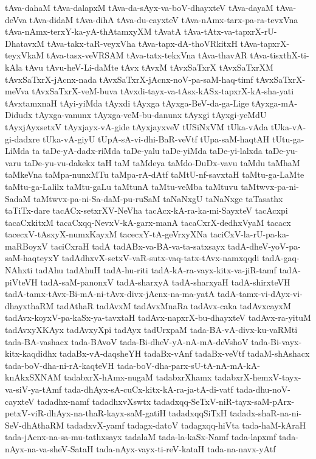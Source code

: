 {tAva-dahaM
tAva-dalapxM
tAva-da-sAyx-va-boV-dhayxteV
tAva-dayaM
tAva-deVva
tAva-didaM
tAva-dihA
tAva-du-cayxteV
tAva-nAmx-tarx-pa-ra-tevxVna
tAva-nAmx-terxY-ka-yA-thAtamxyXM
tAvatA
tAva-tAtx-va-tapxrX-rU-DhatavxM
tAva-takx-taR-veyxVha
tAva-tapx-dA-thoVRkitxH
tAva-tapxrX-teyxVkaM
tAva-tasx-veVRSAM
tAva-tatx-tekxVna
tAva-thavAR
tAva-tisxthX-ti-kAla
tAvu
tAvu-heV-Li-daMte
tAvx
tAvxM
tAvxSaTxrX
tAvxSaTxrXM
tAvxSaTxrX-jAcnx-nada
tAvxSaTxrX-jAcnx-noV-pa-saM-haq-timf
tAvxSaTxrX-meVva
tAvxSaTxrX-veM-buva
tAvxdi-tayx-va-tAsx-kASx-tapxrX-kA-sha-yati
tAvxtamxnaH
tAyi-yiMda
tAyxdi
tAyxga
tAyxga-BeV-da-ga-Lige
tAyxga-mA-Didudx
tAyxga-vanunx
tAyxga-veM-bu-danunx
tAyxgi
tAyxgi-yeMdU
tAyxjAyxsetxV
tAyxjayx-vA-gide
tAyxjayxveV
tUSiNxVM
tUka-vAda
tUka-vA-gi-dadxre
tUka-vA-giyU
tUpA-sA-vi-dhi-BaR-veVtf
tUpa-saM-haqtAH
tUtu-ga-LiMda
ta
taDe-yA-dadx-riMda
taDe-yalu
taDe-yiMda
taDe-yi-lalxda
taDe-yu-varu
taDe-yu-vu-dakekx
taH
taM
taMdeya
taMdo-DuDx-vavu
taMdu
taMhaM
taMkeVna
taMpa-nunxMTu
taMpa-rA-dAtf
taMtU-nf-savxtaH
taMtu-ga-LaMte
taMtu-ga-Lalilx
taMtu-gaLu
taMtunA
taMtu-veMba
taMtuvu
taMtwvx-pa-ni-SadaM
taMtwvx-pa-ni-Sa-daM-pu-ruSaM
taNaNxgU
taNaNxge
taTasathx
taTiTx-dare
tacACx-setxrXV-NeVha
tacAcx-kA-ra-ka-mi-SayxteV
tacAcxpi
tacaCxkitxM
tacaCxqq-NevxV-kA-garx-manA
tacaCxrX-dedhxVyaM
tacacx
tacecxV-tAsxyX-numxKayxM
tacecxY-tA-geVrxyXNa
taciCxV-la-rU-pa-ka-maRBoyxV
taciCxraH
tadA
tadABx-va-BA-va-ta-satxsayx
tadA-dheV-yoV-pa-saM-haqteyxY
tadAdhxvX-setxV-vaR-sutx-vaq-tatx-tAvx-namxqqdi
tadA-gaq-NAhxti
tadAhu
tadAhuH
tadA-hu-riti
tadA-kA-ra-vayx-kitx-va-jiR-tamf
tadA-piVteVH
tadA-saM-panonxV
tadA-sharxyA
tadA-sharxyaH
tadA-shirxteVH
tadA-tamx-tAvx-Bi-mA-ni-tAvx-divx-jAcnx-na-ma-yatA
tadA-tamx-vi-dAyx-vi-dhayxthaRM
tadAthaR
tadAvxM
tadAvxMnaRa
tadAvx-caka
tadAvxcayxM
tadAvx-koyxV-pa-kaSx-ya-tavxtaH
tadAvx-napxrX-bu-dhayxteV
tadAvx-ra-yituM
tadAvxyXKAyx
tadAvxyXpi
tadAyx
tadUrxpaM
tada-BA-vA-divx-ku-vaRMti
tada-BA-vashacx
tada-BAvoV
tada-Bi-dheV-yA-nA-mA-deVshoV
tada-Bi-vayx-kitx-kaqdidhx
tadaBx-vA-daqsheYH
tadaBx-vAnf
tadaBx-veVtf
tadaM-shAshacx
tada-boV-dha-ni-rA-kaqteVH
tada-boV-dha-parx-sU-tA-nA-mA-kA-knAkxSXNAM
tadabxrX-hAmx-nugaM
tadabxrXhamx
tadabxrX-hemxV-tayx-va-siV-ya-tAmf
tada-dhAyx-sA-cuCx-kitx-kA-ra-ja-tA-di-vatf
tada-dhu-noV-cayxteV
tadadhx-namf
tadadhxvXswtx
tadadxqq-SeTxV-niR-tayx-saM-pArx-petxV-viR-dhAyx-na-thaR-kayx-saM-gatiH
tadadxqqSiTxH
tadadx-shaR-na-ni-SeV-dhAthaRM
tadadxvX-yamf
tadagx-datoV
tadagxqq-hiVta
tada-haM-kAraH
tada-jAcnx-na-sa-mu-tathxsayx
tadalaM
tada-la-kaSx-Namf
tada-lapxmf
tada-nAyx-na-va-sheV-SataH
tada-nAyx-vayx-ti-reV-kataH
tada-na-navx-yAtf
}
